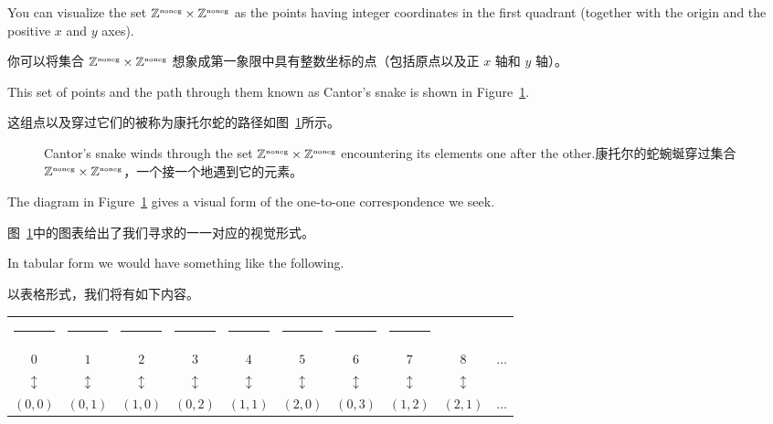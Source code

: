 You can visualize the set ${\mathbb Z}^{\mbox{\tiny noneg}} \times {\mathbb Z}^{\mbox{\tiny noneg}}$ as the
points having integer coordinates
in the first quadrant (together with the origin and the positive
$x$ and $y$ axes).

你可以将集合 ${\mathbb Z}^{\mbox{\tiny noneg}} \times {\mathbb Z}^{\mbox{\tiny noneg}}$ 想象成第一象限中具有整数坐标的点（包括原点以及正 $x$ 轴和 $y$ 轴）。

This set of points and the path through them known as Cantor's snake is
shown in Figure~\ref{fig:cantors_snake_2}.

这组点以及穿过它们的被称为康托尔蛇的路径如图~\ref{fig:cantors_snake_2}所示。

\begin{figure}[!btp]
    
    \caption[Cantor's snake. 康托尔的蛇。]{Cantor's snake winds through the set %
        ${\mathbb Z}^{\mbox{\tiny noneg}} \times {\mathbb Z}^{\mbox{\tiny noneg}}$ encountering its
        elements one after the other.康托尔的蛇蜿蜒穿过集合 %
        ${\mathbb Z}^{\mbox{\tiny noneg}} \times {\mathbb Z}^{\mbox{\tiny noneg}}$，一个接一个地遇到它的元素。}
    \label{fig:cantors_snake_2}
\end{figure}

The diagram in Figure~\ref{fig:cantors_snake_2} gives a visual form of the one-to-one correspondence
we seek.

图~\ref{fig:cantors_snake_2}中的图表给出了我们寻求的一一对应的视觉形式。

In tabular form we would have something like the following.

以表格形式，我们将有如下内容。

\medskip

\begin{tabular}{cccccccccc}
    \rule{32pt}{0pt} & \rule{32pt}{0pt} & \rule{32pt}{0pt} & \rule{32pt}{0pt} & \rule{32pt}{0pt} & \rule{32pt}{0pt} & \rule{32pt}{0pt} & \rule{32pt}{0pt}                             \\
    $0$              & $1$              & $2$              & $3$              & $4$              & $5$              & $6$              & $7$              & $8$            & $\ldots$ \\
    $\updownarrow$   & $\updownarrow$   & $\updownarrow$   & $\updownarrow$   & $\updownarrow$   & $\updownarrow$   & $\updownarrow$   & $\updownarrow$   & $\updownarrow$ &          \\
    $(0, 0)$         & $(0, 1)$         & $(1, 0)$         & $(0, 2)$         & $(1, 1)$         & $(2, 0)$         & $(0, 3)$         & $(1,2)$          & $(2, 1)$       & $\ldots$ \\
\end{tabular}
\medskip

